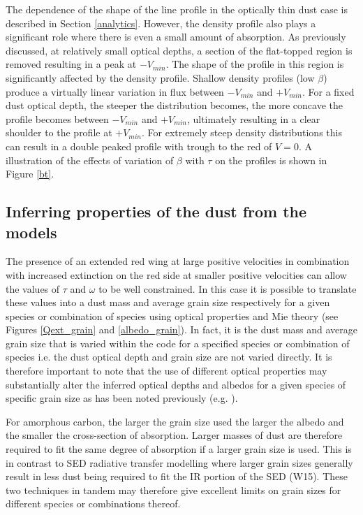 The dependence of the shape of the line profile in the optically thin dust case 
is described in Section \ref{analytics}.  However, the density profile 
also plays a significant role where there is even a small amount of 
absorption.  As previously discussed, at relatively small optical depths, 
a section of the flat-topped region is removed resulting in a peak at 
$-V_{min}$.  The shape of the profile in this region is significantly 
affected by the density profile.  Shallow density profiles (low $\beta$) produce a virtually 
linear variation in flux between $-V_{min}$ and $+V_{min}$.  For a fixed dust
optical depth, the steeper the distribution becomes, the more concave the 
profile becomes between $-V_{min}$ and $+V_{min}$, ultimately resulting in 
a clear shoulder to the profile at $+V_{min}$.  For extremely steep density
distributions this can result in a double peaked profile with 
trough to the red of $V=0$.  A illustration of the effects of variation of 
$\beta$ with $\tau$ on the profiles is shown in Figure \ref{bt}.

\subsection{Inferring properties of the dust from the models}

The presence of an extended red wing at large positive velocities in 
combination with increased extinction on the red side at smaller positive 
velocities can allow the values of $\tau$ and $\omega$ to be well 
constrained.  In this case it is possible to translate these values into a 
dust mass and average grain size respectively for a given species or combination of 
species using  optical properties and Mie theory (see Figures 
\ref{Qext_grain} and \ref{albedo_grain}).  In fact, it is the dust mass and average grain size 
that is varied within the code for a specified species or combination of 
species i.e. the dust optical depth and grain size are not varied directly.  It is therefore important to note that the use of different 
optical properties may substantially alter the inferred optical depths and 
albedos for a given species of specific grain size as has been noted 
previously (e.g. \citet{Owen2015}).



For amorphous carbon, the larger the grain size used the larger the albedo 
and the smaller the cross-section of absorption.  Larger masses of dust 
are therefore required to fit the same degree of absorption if a larger 
grain size is used.  This is in contrast to SED radiative transfer 
modelling where larger grain sizes generally result in less dust being 
required to fit the IR portion of the SED (W15).  These two techniques in 
tandem may therefore give excellent limits on grain sizes for different 
species or combinations thereof.

